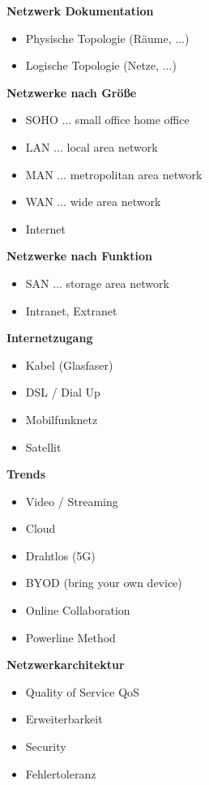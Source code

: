 \textbf{Netzwerk Dokumentation}
\begin{itemize}
	\item Physische Topologie (Räume, ...)
	\item Logische Topologie (Netze, ...)
\end{itemize}

\textbf{Netzwerke nach Größe}
\begin{itemize}
	\item SOHO ... small office home office
	\item LAN ... local area network
	\item MAN ... metropolitan area network
	\item WAN ... wide area network
	\item Internet
\end{itemize}

\textbf{Netzwerke nach Funktion}
\begin{itemize}
	\item SAN ... storage area network
	\item Intranet, Extranet
\end{itemize}

\textbf{Internetzugang}
\begin{itemize}
	\item Kabel (Glasfaser)
	\item DSL / Dial Up
	\item Mobilfunknetz
	\item Satellit
\end{itemize}

\textbf{Trends}
\begin{itemize}
	\item Video / Streaming
	\item Cloud
	\item Drahtlos (5G)
	\item BYOD (bring your own device)
	\item Online Collaboration
	\item Powerline Method
\end{itemize}

\textbf{Netzwerkarchitektur}
\begin{itemize}
	\item Quality of Service QoS
	\item Erweiterbarkeit
	\item Security
	\item Fehlertoleranz
\end{itemize}

